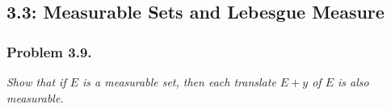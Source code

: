 \documentclass{article}
\begin{document}



\subsection*{3.3: Measurable Sets and Lebesgue Measure \\}



\subsubsection*{Problem 3.9.}
\emph{Show that if $E$ is a measurable set, then each translate $E+y$ of $E$
is also measurable.} \\
\end{document}
